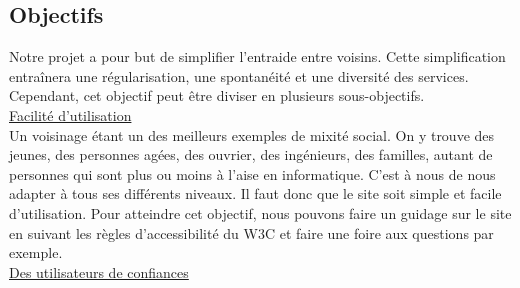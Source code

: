 \documentclass[a4paper,11pt]{article}
\begin{document}
\subsection{Objectifs}

Notre projet a pour but de simplifier l’entraide entre voisins. Cette simplification entraînera une
régularisation, une spontanéité et une diversité des services.\\

Cependant, cet objectif peut être diviser en plusieurs sous-objectifs.\\





\underline{Facilité d'utilisation}\\

Un voisinage étant un des meilleurs exemples de mixité social.
On y trouve des jeunes, des personnes agées, des ouvrier, des ingénieurs, des familles, autant de personnes qui sont plus ou moins à l'aise en informatique.
C'est à nous de nous adapter à tous ses différents niveaux. Il faut donc que le site soit simple et facile d'utilisation.
Pour atteindre cet objectif, nous pouvons faire un guidage sur le site en suivant les règles d'accessibilité du W3C et faire une foire aux questions par exemple.\\

\underline{Des utilisateurs de confiances}\\
\end{document}
